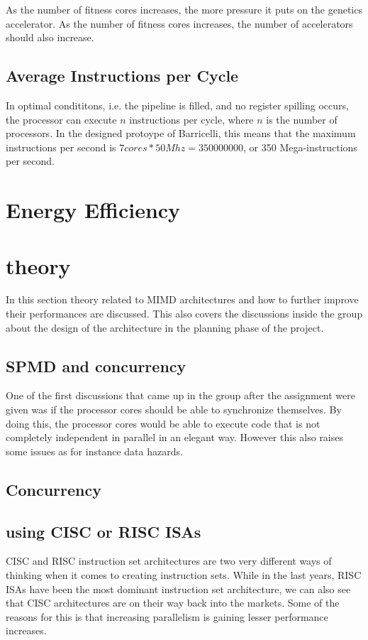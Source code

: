 As the number of fitness cores increases, the more pressure it puts on the genetics accelerator.
As the number of fitness cores increases, the number of accelerators should also increase.

\subsection{Average Instructions per Cycle}

In optimal condititons, i.e. the pipeline is filled, and no register spilling occurs, the processor can execute $ n $ instructions per cycle, where $ n $ is the number of processors.
In the designed protoype of Barricelli, this means that the maximum instructions per second is $ 7 cores * 50Mhz = 350 000 000 $, or 350 Mega-instructions per second.

\section{Energy Efficiency}

\section{theory}
In this section theory related to MIMD architectures and how to further improve their performances are discussed.
This also covers the discussions inside the group about the design of the architecture in the planning phase of the project.
\subsection{SPMD and concurrency}
One of the first discussions that came up in the group after the assignment were given was if the processor cores should
be able to synchronize themselves. By doing this, the processor cores would be able to execute code that is not completely independent in parallel in an elegant way.
However this also raises some issues as for instance data hazards.


\subsection{Concurrency} 





\subsection{using CISC or RISC ISAs}
CISC and RISC instruction set architectures are two very different ways of thinking when it comes to creating instruction sets.
While in the last years, RISC ISAs have been the most dominant instruction set architecture, we can also see that CISC architectures
are on their way back into the markets. Some of the reasons for this is that increasing parallelism is gaining lesser performance increases.

